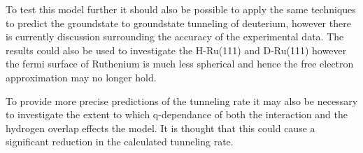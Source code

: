 To test
this model further
it should also be possible
to apply the same
techniques
to predict the
groundstate to
groundstate tunneling
of deuterium, however
there is currently
discussion
surrounding the
accuracy of the
experimental data.
The results could
also be used to
investigate the
H-Ru(111) and D-Ru(111) %
however the fermi
surface of Ruthenium
is much less spherical
and hence
the free electron
approximation may
no longer hold.

To provide more precise
predictions of the
tunneling rate
it may also be necessary
to investigate the
extent to which q-dependance
of both the interaction
and the hydrogen overlap
effects the model. It is thought
that this could cause a
significant reduction in
the calculated tunneling
rate.






